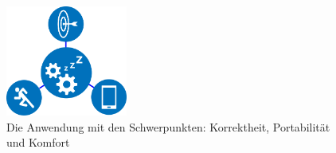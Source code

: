 \begin{figure}[h] 
  \begin{center}
    \includegraphics[width=4cm]{img/all}
    \caption[Schwerpunkte der Anwendung]{Die Anwendung mit den Schwerpunkten: Korrektheit, Portabilität und Komfort \label{fig:emphasis}}
  \end{center}
\end{figure}